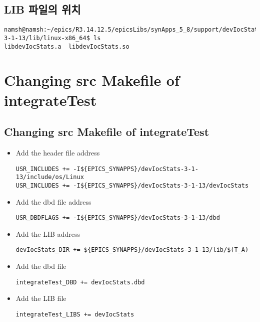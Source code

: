 \documentclass[11pt
  , a4paper
  , article
  , oneside
]{memoir}
\begin{document}
\subsection{LIB 파일의 위치}
\begin{lstlisting}[style=termstyle]
namsh@namsh:~/epics/R3.14.12.5/epicsLibs/synApps_5_8/support/devIocStats-3-1-13/lib/linux-x86_64$ ls
libdevIocStats.a  libdevIocStats.so
\end{lstlisting}
\section{Changing src Makefile of integrateTest}
\subsection{Changing src Makefile of integrateTest}
\begin{itemize}
	\item Add the header file address
	\begin{lstlisting}[style=termstyle]
USR_INCLUDES += -I${EPICS_SYNAPPS}/devIocStats-3-1-13/include/os/Linux
USR_INCLUDES += -I${EPICS_SYNAPPS}/devIocStats-3-1-13/devIocStats
\end{lstlisting}
	\item Add the dbd file address
	\begin{lstlisting}[style=termstyle]
USR_DBDFLAGS += -I${EPICS_SYNAPPS}/devIocStats-3-1-13/dbd
\end{lstlisting}
	\item Add the LIB address
	\begin{lstlisting}[style=termstyle]
devIocStats_DIR += ${EPICS_SYNAPPS}/devIocStats-3-1-13/lib/$(T_A)
\end{lstlisting}
	\item Add the dbd file
	\begin{lstlisting}[style=termstyle]
integrateTest_DBD += devIocStats.dbd
\end{lstlisting}
	\item Add the LIB file
	\begin{lstlisting}[style=termstyle]
integrateTest_LIBS += devIocStats
\end{lstlisting}
\end{itemize}
\end{document}
